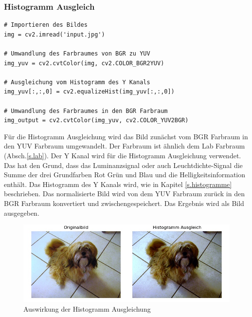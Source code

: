 \documentclass[a4paper,12pt,oneside]{article}
\begin{document}
\subsubsection{Histogramm Ausgleich}
\begin{lstlisting}
# Importieren des Bildes
img = cv2.imread('input.jpg')

# Umwandlung des Farbraumes von BGR zu YUV
img_yuv = cv2.cvtColor(img, cv2.COLOR_BGR2YUV)

# Ausgleichung vom Histogramm des Y Kanals
img_yuv[:,:,0] = cv2.equalizeHist(img_yuv[:,:,0])

# Umwandlung des Farbraumes in den BGR Farbraum
img_output = cv2.cvtColor(img_yuv, cv2.COLOR_YUV2BGR)
\end{lstlisting}
Für die Histogramm Ausgleichung \cite{histogram2012equalisation} wird das Bild zunächst vom BGR Farbraum in den YUV Farbraum umgewandelt. Der Farbraum ist ähnlich dem Lab Farbraum (Absch.\ref{s.lab}). Der Y Kanal wird für die Histogramm Ausgleichung verwendet. Das hat den Grund, dass das Luminanzsignal oder auch Leuchtdichte-Signal die Summe der drei Grundfarben Rot Grün und Blau und die Helligkeitsinformation enthält. Das Histogramm des Y Kanals wird, wie in Kapitel \ref{s.histogramme} beschrieben. Das normalisierte Bild wird von dem YUV Farbraum zurück in den BGR Farbraum konvertiert und zwischengespeichert. Das Ergebnis wird als Bild ausgegeben.
\begin{figure}
	[h]
	\centering
	\includegraphics[scale=0.7]{Sources/histeq.jpg}
	\caption{Auswirkung der Histogramm Ausgleichung}
	\label{img:histogrameq}
\end{figure}
	
\end{document}
